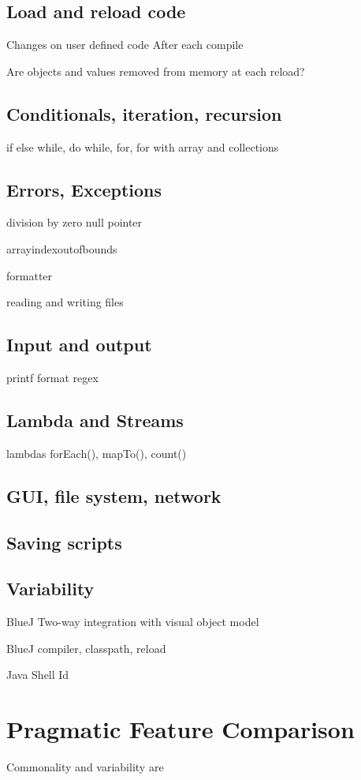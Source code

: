\documentclass{article}
\begin{document}
\subsection{Load and reload code}
Changes on user defined code
After each compile

Are objects and values removed from memory at each reload?
 

\subsection{Conditionals, iteration, recursion}
if else
while, do while, for, for with array and collections

\subsection{Errors, Exceptions}
division by zero
null pointer

arrayindexoutofbounds

formatter

reading and writing files


\subsection{Input and output}
printf
format
regex

\subsection{Lambda and Streams}
lambdas
forEach(), mapTo(), count()

\subsection{GUI, file system, network}

\subsection{Saving scripts}

\subsection{Variability}
BlueJ Two-way integration with visual object model

BlueJ compiler, classpath, reload

Java Shell Id


\section{Pragmatic Feature Comparison}
Commonality and variability are
\end{document}
